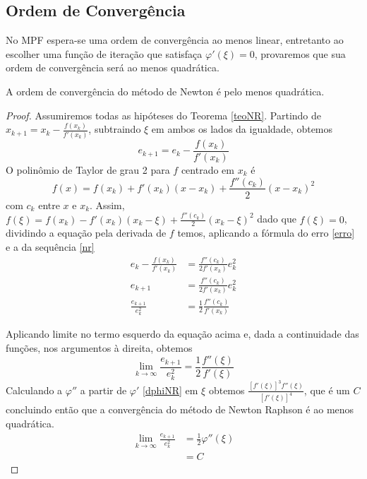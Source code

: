 \subsection{Ordem de Convergência}
No MPF espera-se uma ordem de convergência ao menos linear, entretanto ao escolher uma função de iteração que satisfaça $\varphi'(\xi) = 0$, provaremos que sua ordem de convergência será ao menos quadrática.
\begin{prop}
    A ordem de convergência do método de Newton é pelo menos quadrática.
\end{prop}
\begin{proof}
    Assumiremos todas as hipóteses do Teorema \ref{teoNR}. %
    Partindo de $x_{k+1} = x_k - \frac{f(x_k)}{f'(x_k)}$, subtraindo $\xi$ em ambos os lados da igualdade, obtemos
\begin{equation} \label{eMNR}
    e_{k+1} = e_k - \frac{f(x_k)}{f'(x_k)} 
\end{equation}
O polinômio de Taylor de grau 2 para $f$ centrado em $x_k$ é
\begin{equation*}
    f(x) = f(x_k) + f'(x_k)(x - x_k) + \frac{f''(c_k)}{2}(x-x_k)^2
\end{equation*}
com $c_k$ entre $x$ e $x_k$.
Assim, $f(\xi) = f(x_k) - f'(x_k)(x_k - \xi) + \frac{f''(c_k)}{2}(x_k-\xi)^2$ dado que $f(\xi) = 0$, dividindo a equação pela derivada de $f$ temos, aplicando a fórmula do erro \ref{erro} e a da sequência \ref{nr}
\begin{align*}
    e_k - \frac{f(x_k)}{f'(x_k)} &= \frac{f''(c_k)}{2f'(x_k)}e_k^2 \\
    e_{k+1} &= \frac{f''(c_k)}{2f'(x_k)}e_k^2 \\
    \frac{e_{k+1}}{e_k^2} &= \frac{1}{2} \frac{f''(c_k)}{f'(x_k)}
\end{align*}

Aplicando limite no termo esquerdo da equação acima e, dada a continuidade das funções, nos argumentos à direita, obtemos 
\begin{equation*}
    \lim_{k \to \infty} \frac{e_{k+1}}{e_k^2} = \frac{1}{2} \frac{f''(\xi)}{f'(\xi)}
\end{equation*}
Calculando a $\varphi''$ a partir de $\varphi'$ \ref{dphiNR} %
em $\xi$ obtemos $\frac{[f'(\xi)]^3f''(\xi)}{[f'(\xi)]^4}$, que é um $C$ concluindo então que a convergência do método de Newton Raphson é ao menos quadrática.
\begin{align*}
    \lim_{k \to \infty} \frac{e_{k+1}}{e_k^2} &= \frac{1}{2} \varphi''(\xi) \\
    &= C
\end{align*}
\end{proof}

